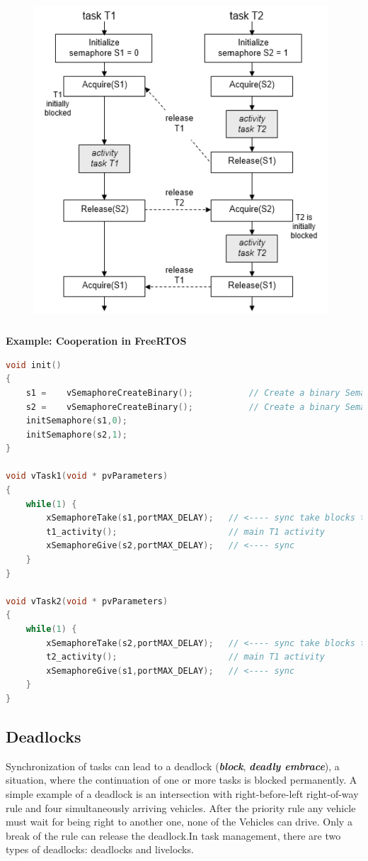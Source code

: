 	\begin{figure}[h]
    \centering
    \includegraphics[width=11cm, height=12cm]{Images/image107.png}
    \label{fig:Fig }
    \end{figure}

\textbf{Example: Cooperation in FreeRTOS  }

\begin{lstlisting}[style=mystyle, language=c]
void init()
{
	s1 =	vSemaphoreCreateBinary();			// Create a binary Semaphore 
	s2 =	vSemaphoreCreateBinary();			// Create a binary Semaphore 
	initSemaphore(s1,0);  	
	initSemaphore(s2,1);
}

void vTask1(void * pvParameters)
{
	while(1) {
		xSemaphoreTake(s1,portMAX_DELAY);	// <---- sync take blocks task !
		t1_activity();						// main T1 activity
		xSemaphoreGive(s2,portMAX_DELAY);	// <---- sync 
 	}
}

void vTask2(void * pvParameters)
{
	while(1) {
		xSemaphoreTake(s2,portMAX_DELAY);	// <---- sync take blocks task !
		t2_activity();						// main T1 activity
		xSemaphoreGive(s1,portMAX_DELAY);	// <---- sync 
 	}
}
\end{lstlisting}

\subsection{Deadlocks}

Synchronization of tasks can lead to a deadlock (\textbf{\textit{block}}, \textbf{\textit{deadly embrace}}), a situation, where the continuation of one or more tasks is blocked permanently. A simple example of a deadlock is an intersection with right-before-left right-of-way rule and four simultaneously arriving vehicles. After the priority rule any vehicle must wait for being right to another one, none of the Vehicles can drive. Only a break of the rule can release the deadlock.In task management, there are two types of deadlocks: deadlocks and livelocks.\\

